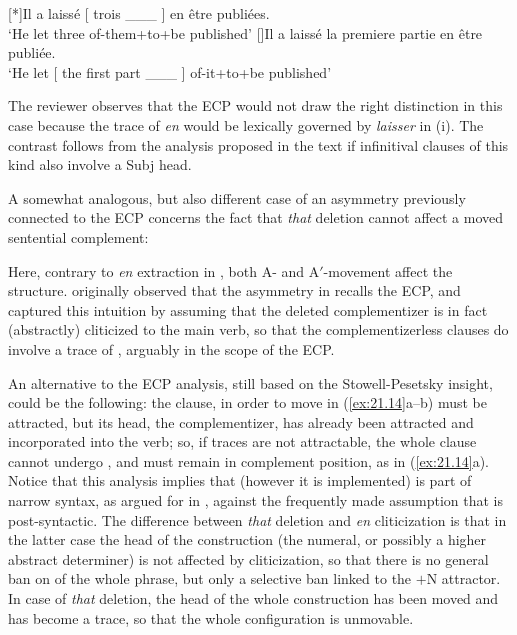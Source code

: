\documentclass[output=paper]{langsci/langscibook}
\begin{document}
\begin{exe}
{\begin{exe}
    [*]{Il a laissé [ trois \_\_\_ ]  en être publiées.\\
        ‘He let three of-them+to+be published’}
    []{Il a laissé la premiere partie en être publiée.\\
        ‘He let [ the first part \_\_\_ ] of-it+to+be published’}
\end{exe}
%
The reviewer observes that the \gls{ECP} would not draw the right distinction
in this case because the trace of \emph{en} would be lexically governed by
\emph{laisser} in (i). The contrast follows from the analysis proposed in the
text if infinitival clauses of this kind also involve a  Subj\tss{[$+$N]} head.}

A somewhat analogous, but also different case of an asymmetry previously
connected to the \gls{ECP} concerns the fact that \emph{that} deletion cannot
affect a moved sentential complement:

\ea%
    \label{ex:21.14}
    \z
\z
%
Here, contrary to \emph{en} extraction in , both A- and A$'$-movement
affect the structure. \citet{Stowell1981} originally observed that the
asymmetry in  recalls the \gls{ECP}, and \citet{Pesetsky1995}
captured this intuition by assuming that the deleted complementizer is in fact
(abstractly) cliticized to the main verb, so that the complementizerless
clauses do involve a trace of , arguably in the scope of the ECP.

An alternative to the \gls{ECP} analysis, still based on the Stowell-Pesetsky
insight, could be the following: the clause, in order to move in
(\ref{ex:21.14}a--b) must be attracted, but its head, the complementizer, has
already been attracted and incorporated into the verb; so, if traces are not
attractable, the whole clause cannot undergo , and must remain in
complement position, as in  (\ref{ex:21.14}a). Notice that this analysis
implies that  (however it is implemented) is part of narrow
syntax, as argued for in \citet{Roberts2010}, against the frequently made
assumption that  is post-syntactic. The difference between
\emph{that} deletion and \emph{en} cliticization is that in the latter case the
head of the construction (the numeral, or possibly a higher abstract
determiner) is not affected by cliticization, so that there is no general ban
on  of the whole phrase, but only a selective ban linked to the $+$N
attractor. In case of \emph{that} deletion, the head of the whole construction
has been moved and has become a trace, so that the whole configuration is
unmovable.


\end{exe}
\end{document}
